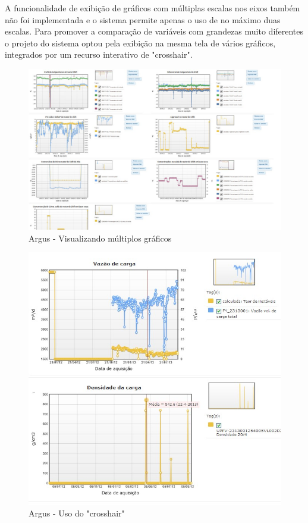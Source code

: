 \documentclass[]{article}
\begin{document}
A funcionalidade de exibição de gráficos com múltiplas escalas nos eixos também não foi implementada e o sistema permite apenas o uso de no máximo duas escalas. Para promover a comparação de variáveis com grandezas muito diferentes o projeto do sistema optou pela exibição na mesma tela de vários gráficos, integrados por um recurso interativo de "crosshair".

\begin{figure}[!ht]
\centering
\includegraphics[scale=.4]{./argus_multigraficos}
\caption{Argus - Visualizando múltiplos gráficos}
\label{fig:argus_multigraficos}
\end{figure}

\begin{figure}[!ht]
\centering
\includegraphics[scale=.4]{./crosshair}
\caption{Argus - Uso do "crosshair"}
\label{fig:crosshair}
\end{figure}
\end{document}
